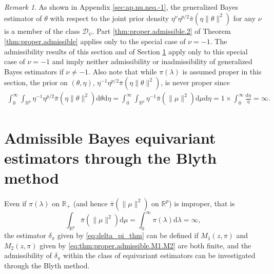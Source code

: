 \documentclass[preprint,11pt]{imsart}
\numberwithin{equation}{section}
\theoremstyle{plain}
\theoremstyle{definition}
\theoremstyle{remark}
\newtheorem{remark}{Remark}[section]
\newcommand{\rd}{\mathrm{d}}
\begin{document}
\begin{remark}
 As shown in Appendix \ref{sec:ap.nu.neq.-1},
 the generalized Bayes estimator of $\theta$ with respect to
	the joint prior density $\eta^\nu\eta^{p/2}\bar{\pi}(\eta\|\theta\|^2)$
for any $\nu$ is a member of the class $\mathcal{D}_\psi$.
Part \ref{thm:proper.admissible.2} of Theorem \ref{thm:proper.admissible}
applies only to the special case of $\nu=-1$. 
The admissibility results of this section and of Section \ref{sec:equiv.blyth}
 apply only to this special case of $\nu=-1$ and imply neither admissibility
 or inadmissibility of generalized Bayes estimators if $\nu\neq -1$.
 Also note that while $\pi(\lambda)$ is assumed proper in this section,
 the prior on $(\theta,\eta)$, $\eta^{-1}\eta^{p/2}\bar{\pi}(\eta\|\theta\|^2)$, is never proper
 since
 \begin{align*}
  \int_0^\infty \!\!\int_{\mathbb{R}^p} \eta^{-1}\eta^{p/2}\bar{\pi}(\eta\|\theta\|^2)\rd\theta\rd \eta 
=\int_0^\infty \!\!\int_{\mathbb{R}^p} \eta^{-1}\bar{\pi}(\|\mu\|^2)\rd\mu\rd \eta 
=1\times\int_0^\infty \frac{\rd \eta}{\eta}=\infty.
 \end{align*}
\end{remark}


 \section{Admissible Bayes equivariant estimators through the Blyth method}
 \label{sec:equiv.blyth}
Even if $\pi(\lambda)$ on $\mathbb{R}_+$ (and hence $\bar{\pi}(\|\mu\|^2)$ on $\mathbb{R}^p$) is improper,
that is
\begin{equation}\label{eq:improper.pi.0}
\int_{\mathbb{R}^p}\bar{\pi}(\|\mu\|^2) \rd \mu
  =\int_0^\infty\pi(\lambda) \rd \lambda=\infty,
\end{equation}
the estimator $\delta_\pi$ given by \eqref{eq:delta_pi_thm} can be defined
if $M_1(z,\pi)$ and $M_2(z,\pi)$ given by \eqref{eq:thm:proper.admissible.M1.M2} %
are both finite, and the admissibility of $\delta_\pi$ within the class of
equivariant estimators can be investigated through the Blyth method.
\end{document}
